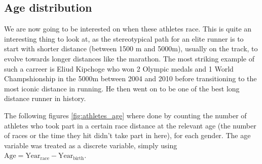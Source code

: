 \documentclass[10pt, a4paper]{article}
\begin{document}
\subsection{Age distribution}

We are now going to be interested on when these athletes race. This is quite an interesting thing to look at, as the stereotypical path for an elite runner is to start with shorter distance (between 1500 m and 5000m), usually on the track, to evolve towards longer distances like the marathon. The most striking example of such a carreer is Eliud Kipchoge who won 2 Olympic medals and 1 World Champshionship in the 5000m between 2004 and 2010 before transitioning to the most iconic distance in running. He then went on to be one of the best long distance runner in history. 

The following figures \ref{fig:athletes_age} where done by counting the number of athletes who took part in a certain race distance at the relevant age (the number of races or the time they hit didn't take part in here), for each gender. The age variable was treated as a discrete variable, simply using $\text{Age} = \text{Year}_{\text{race}} - \text{Year}_{\text{birth}}$.
\end{document}

